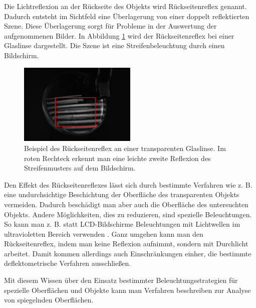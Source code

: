 \noindent
Die Lichtreflexion an der Rückseite des Objekts wird Rückseitenreflex genannt.
Dadurch entsteht im Sichtfeld eine Über\-la\-ge\-rung von einer doppelt reflektierten Szene.
Diese Über\-la\-ge\-rung sorgt für Probleme in der Auswertung der aufgenommenen Bilder.
In Abbildung \ref{img:rueckseitenreflexBeispiel} wird der Rückseitenreflex bei einer Glaslinse dargestellt.
Die Szene ist eine Streifenbeleuchtung durch einen Bildschirm.

\begin{figure}[H]
	\centering
	\includegraphics[width=0.5\textwidth]{02_grundlagenDerDeflektometrie/spiegelndeOberflaechen/figures/rueckseitenreflexBeispiel}
	\caption[Beispiel Rückseitenreflex]{Beispiel des Rückseitenreflex an einer transparenten Glaslinse. Im roten Rechteck erkennt man eine leichte zweite Reflexion des Streifenmusters auf dem Bildschirm.}
	\label{img:rueckseitenreflexBeispiel}
\end{figure}

\noindent
Den Effekt des Rückseitenreflexes lässt sich durch bestimmte Verfahren wie z. B. eine undurchsichtige Beschichtung der Oberfläche des transparenten Objekts vermeiden.
Dadurch beschädigt man aber auch die Oberfläche des untersuchten Objekts.
Andere Mög\-lich\-keiten, dies zu reduzieren, sind spezielle Beleuchtungen.
So kann man z. B. statt LCD-Bildschirme Beleuchtungen mit Lichtwellen im ultravioletten Bereich verwenden \cite{invisionUVDeflektometrie}.
Ganz umgehen kann man den Rückseitenreflex, indem man keine Reflexion aufnimmt, sondern mit Durchlicht arbeitet.
Damit kommen allerdings auch Einschränkungen einher, die bestimmte deflektometrische Verfahren ausschließen.

\p
Mit diesem Wissen über den Einsatz bestimmter Beleuchtungsstrategien für spezielle Oberflächen und Objekte kann man Verfahren beschreiben zur Analyse von spiegelnden Oberflächen.